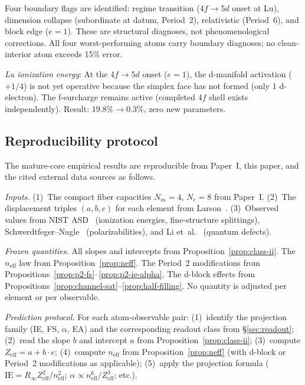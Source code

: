 \documentclass[11pt,a4paper]{article}
\begin{document}
Four boundary flags are identified: regime transition ($4f \to 5d$ onset at Lu), dimension collapse (subordinate at datum, Period~2), relativistic (Period~6), and block edge ($e = 1$). These are structural diagnoses, not phenomenological corrections. All four worst-performing atoms carry boundary diagnoses; no clean-interior atom exceeds 15\% error.

\emph{Lu ionization energy}: At the $4f \to 5d$ onset ($e = 1$), the d-manifold activation ($+1/4$) is not yet operative because the simplex face has not formed (only 1 d-electron). The f-surcharge remains active (completed $4f$ shell exists independently). Result: $19.8\% \to 0.3\%$, zero new parameters.

\subsection{Reproducibility protocol}
\label{sec:protocol}

The mature-core empirical results are reproducible from Paper~I, this paper, and the cited external data sources as follows.

\emph{Inputs.} (1)~The compact fiber capacities $N_m = 4$, $N_e = 8$ from Paper~I. (2)~The displacement triples $(a, b, c)$ for each element from Larson~\cite{Larson1979,Larson1988}. (3)~Observed values from NIST ASD~\cite{NIST_ASD} (ionization energies, fine-structure splittings), Schwerdtfeger--Nagle~\cite{Schwerdtfeger2019} (polarizabilities), and Li et~al.~\cite{Li2003} (quantum defects).

\emph{Frozen quantities.} All slopes and intercepts from Proposition~\ref{prop:class-ii}. The $n_{\mathrm{eff}}$ law from Proposition~\ref{prop:neff}. The Period~2 modifications from Propositions~\ref{prop:p2-fs}--\ref{prop:p2-ie-alpha}. The d-block effects from Propositions~\ref{prop:channel-sat}--\ref{prop:half-filling}. No quantity is adjusted per element or per observable.

\emph{Prediction protocol.} For each atom-observable pair: (1)~identify the projection family (IE, FS, $\alpha$, EA) and the corresponding readout class from \S\ref{sec:readout}; (2)~read the slope $b$ and intercept $a$ from Proposition~\ref{prop:class-ii}; (3)~compute $Z_{\mathrm{eff}} = a + b \cdot e$; (4)~compute $n_{\mathrm{eff}}$ from Proposition~\ref{prop:neff} (with d-block or Period~2 modifications as applicable); (5)~apply the projection formula ($\mathrm{IE} = R_\infty Z_{\mathrm{eff}}^2/n_{\mathrm{eff}}^2$; $\alpha \propto n_{\mathrm{eff}}^6/Z_{\mathrm{eff}}^3$; etc.).
\end{document}

